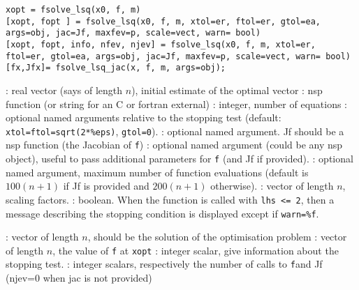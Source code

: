 
\begin{mandesc}
\end{mandesc}

\begin{calling_sequence}
\begin{verbatim}
xopt = fsolve_lsq(x0, f, m)
[xopt, fopt ] = fsolve_lsq(x0, f, m, xtol=er, ftol=er, gtol=ea, args=obj, jac=Jf, maxfev=p, scale=vect, warn= bool) 
[xopt, fopt, info, nfev, njev] = fsolve_lsq(x0, f, m, xtol=er, ftol=er, gtol=ea, args=obj, jac=Jf, maxfev=p, scale=vect, warn= bool) 
[fx,Jfx]= fsolve_lsq_jac(x, f, m, args=obj);
\end{verbatim}
\end{calling_sequence}
\begin{parameters}
  \begin{varlist}
    : real vector (says of length $n$), initial estimate of the optimal vector
    : nsp function (or string for an C or fortran external)
    : integer, number of equations
    : optional named arguments relative to the stopping test (default:
    \verb+xtol=ftol=sqrt(2*%eps)+, \verb+gtol=0+).
    : optional named argument. Jf should be a nsp function (the Jacobian of \verb+f+)
    : optional named argument (could be any nsp object), useful to pass additional parameters for \verb+f+ (and
    Jf if provided).
    : optional named argument, maximum number of function evaluations (default is $100(n+1)$ if Jf is
    provided and $200(n+1)$ otherwise).
    : vector of length $n$, scaling factors.
    : boolean. When the function is called with \verb+lhs <= 2+, then a message describing the 
    stopping condition is displayed except if \verb+warn=%f+.

    : vector of length $n$, should be the solution of the optimisation problem 
    : vector of length $n$, the value of \verb+f+  at \verb+xopt+
    : integer scalar, give information about the stopping test.
    : integer scalars, respectively the number of calls to \verb+f+and Jf (njev=0 when jac is not provided)
  \end{varlist}
\end{parameters}

